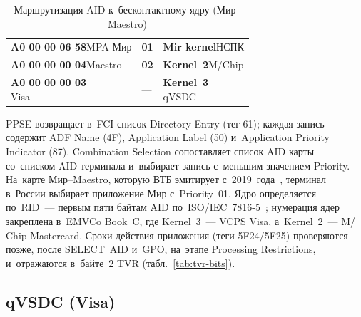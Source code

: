 \begin{table}[tbp]
  \caption{Маршрутизация AID к~бесконтактному ядру (Мир--Maestro)}\label{tab:kernel-dispatch}
  \begingroup
  \tablesetup
  \begin{minipage}{\textwidth}
    \begin{tabularx}{\textwidth}{@{}P{0.3\textwidth} P{0.2\textwidth} Y@{}}
      \toprule
      \headrow
       &  &  \\
      \midrule
      \textbf{A0 00 00 06 58}\newline MPA Мир & \textbf{01} &
      \textbf{Mir kernel}\newline НСПК \\
      \rowsep
      \textbf{A0 00 00 00 04}\newline Maestro & \textbf{02} &
      \textbf{Kernel~2}\newline M/Chip \\
      \rowsep
      {\color{Muted}\textbf{A0 00 00 00 03}\newline Visa} & {\color{Muted}---} &
      {\color{Muted}\textbf{Kernel~3}\newline qVSDC} \\
      \bottomrule
    \end{tabularx}
    \par\smallskip
  \end{minipage}\par
  \endgroup
\end{table}

PPSE возвращает в~FCI список Directory Entry (тег 61); каждая запись содержит ADF
Name (4F), Application Label (50) и~Application Priority Indicator (87).
Combination Selection сопоставляет список AID карты со~списком AID терминала и~выбирает
запись с~меньшим значением Priority. На~карте Мир--Maestro, которую
ВТБ эмитирует с~2019~года~\cite{mir-vtb-maestro-2019}, терминал в~России
выбирает приложение Мир с~Priority~01. Ядро определяется по~RID~---
первым пяти байтам AID по~ISO/IEC~7816-5~\cite{iso-7816-5}; нумерация ядер
закреплена в~EMVCo Book~C, где Kernel~3~--- VCPS Visa, а~Kernel~2~--- M\slash
Chip Mastercard. Сроки действия приложения (теги 5F24\slash 5F25) проверяются
позже, после SELECT~AID и~GPO, на~этапе Processing Restrictions, и~отражаются
в~байте~2 TVR (табл.~\ref{tab:tvr-bits}).

\subsection*{qVSDC (Visa)}

